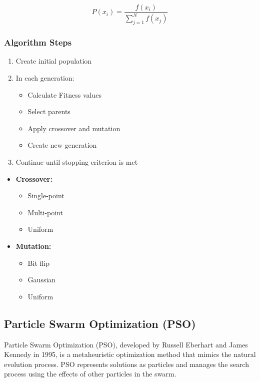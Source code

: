 \begin{equation}
P(x_i) = \frac{f(x_i)}{\sum_{j=1}^N f(x_j)}
\end{equation}


\subsubsection{Algorithm Steps}
\begin{enumerate}
    \item Create initial population
    \item In each generation:
        \begin{itemize}
            \item Calculate Fitness values
            \item Select parents
            \item Apply crossover and mutation
            \item Create new generation
        \end{itemize}
    \item Continue until stopping criterion is met
\end{enumerate}

\begin{tcolorbox}[title=Genetic Operators]
\begin{itemize}
    \item \textbf{Crossover:}
        \begin{itemize}
            \item Single-point
            \item Multi-point
            \item Uniform
        \end{itemize}
    \item \textbf{Mutation:}
        \begin{itemize}
            \item Bit flip
            \item Gaussian
            \item Uniform
        \end{itemize}
\end{itemize}
\end{tcolorbox}

\subsection{Particle Swarm Optimization (PSO)}
Particle Swarm Optimization (PSO), developed by Russell Eberhart and James Kennedy in 1995, is a metaheuristic optimization method that mimics the natural evolution process. PSO represents solutions as particles and manages the search process using the effects of other particles in the swarm.

